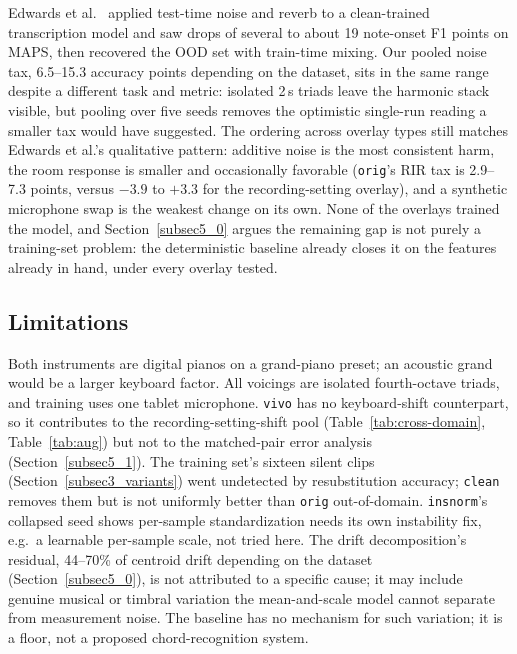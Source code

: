 \documentclass[pdflatex,sn-mathphys-num,iicol]{sn-jnl}
\theoremstyle{thmstyleone}
\theoremstyle{thmstyletwo}
\theoremstyle{thmstylethree}
\begin{document}
Edwards et al.\ \cite{Edwards2024} applied test-time noise and reverb to a clean-trained transcription model and saw drops of several to about 19 note-onset F1 points on MAPS, then recovered the OOD set with train-time mixing. Our pooled noise tax, 6.5--15.3 accuracy points depending on the dataset, sits in the same range despite a different task and metric: isolated 2\,s triads leave the harmonic stack visible, but pooling over five seeds removes the optimistic single-run reading a smaller tax would have suggested. The ordering across overlay types still matches Edwards et al.'s qualitative pattern: additive noise is the most consistent harm, the room response is smaller and occasionally favorable (\texttt{orig}'s RIR tax is 2.9--7.3 points, versus $-3.9$ to $+3.3$ for the recording-setting overlay), and a synthetic microphone swap is the weakest change on its own. None of the overlays trained the model, and Section~\ref{subsec5_0} argues the remaining gap is not purely a training-set problem: the deterministic baseline already closes it on the features already in hand, under every overlay tested.

\subsection{Limitations}\label{subsec5_3}

Both instruments are digital pianos on a grand-piano preset; an acoustic grand would be a larger keyboard factor. All voicings are isolated fourth-octave triads, and training uses one tablet microphone. \texttt{vivo} has no keyboard-shift counterpart, so it contributes to the recording-setting-shift pool (Table~\ref{tab:cross-domain}, Table~\ref{tab:aug}) but not to the matched-pair error analysis (Section~\ref{subsec5_1}). The training set's sixteen silent clips (Section~\ref{subsec3_variants}) went undetected by resubstitution accuracy; \texttt{clean} removes them but is not uniformly better than \texttt{orig} out-of-domain. \texttt{insnorm}'s collapsed seed shows per-sample standardization needs its own instability fix, e.g.\ a learnable per-sample scale, not tried here. The drift decomposition's residual, 44--70\% of centroid drift depending on the dataset (Section~\ref{subsec5_0}), is not attributed to a specific cause; it may include genuine musical or timbral variation the mean-and-scale model cannot separate from measurement noise. The baseline has no mechanism for such variation; it is a floor, not a proposed chord-recognition system.
\end{document}
